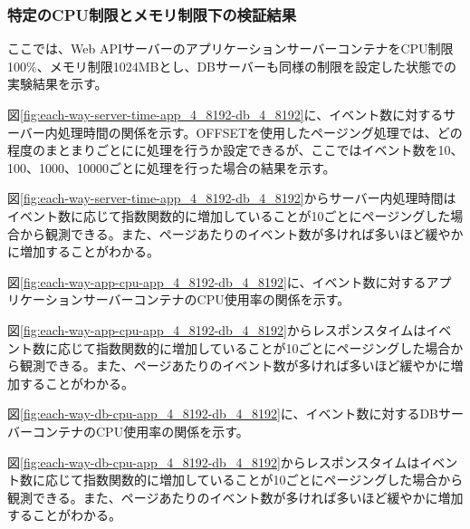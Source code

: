 \documentclass[../../../../main]{subfiles}
\begin{document}
    \subsubsection{特定のCPU制限とメモリ制限下の検証結果}\label{subsubsec:result-each-way-only-limit}

    ここでは、Web APIサーバーのアプリケーションサーバーコンテナをCPU制限100\%、メモリ制限1024MBとし、DBサーバーも同様の制限を設定した状態での実験結果を示す。

    \label{subsubsubsec:result-each-way-only-limit-server-time}

    図\ref{fig:each-way-server-time-app_4_8192-db_4_8192}に、イベント数に対するサーバー内処理時間の関係を示す。OFFSETを使用したページング処理では、どの程度のまとまりごとにに処理を行うか設定できるが、ここではイベント数を10、100、1000、10000ごとに処理を行った場合の結果を示す。

    

    図\ref{fig:each-way-server-time-app_4_8192-db_4_8192}からサーバー内処理時間はイベント数に応じて指数関数的に増加していることが10ごとにページングした場合から観測できる。また、ページあたりのイベント数が多ければ多いほど緩やかに増加することがわかる。

    \label{subsubsubsec:result-each-way-only-limit-cpu}

    図\ref{fig:each-way-app-cpu-app_4_8192-db_4_8192}に、イベント数に対するアプリケーションサーバーコンテナのCPU使用率の関係を示す。

    

    図\ref{fig:each-way-app-cpu-app_4_8192-db_4_8192}からレスポンスタイムはイベント数に応じて指数関数的に増加していることが10ごとにページングした場合から観測できる。また、ページあたりのイベント数が多ければ多いほど緩やかに増加することがわかる。

    図\ref{fig:each-way-db-cpu-app_4_8192-db_4_8192}に、イベント数に対するDBサーバーコンテナのCPU使用率の関係を示す。

    

    図\ref{fig:each-way-db-cpu-app_4_8192-db_4_8192}からレスポンスタイムはイベント数に応じて指数関数的に増加していることが10ごとにページングした場合から観測できる。また、ページあたりのイベント数が多ければ多いほど緩やかに増加することがわかる。

    \label{subsubsubsec:result-each-way-only-limit-mem}
\end{document}
